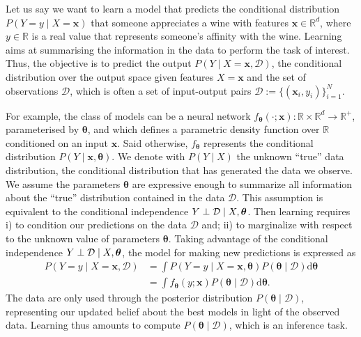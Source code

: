 Let us say we want to learn a model that predicts the conditional distribution $P(Y=y\mid X=\bm{x})$ that someone appreciates a wine with features $\bm{x} \in \mathbb{R}^d$, where $y \in \mathbb{R}$ is a real value that represents someone's affinity with the wine. Learning aims at summarising the information in the data to perform the task of interest. Thus, the objective is to predict the output $P(Y \mid X=\mathbf{x}, \mathcal{D})$, the conditional distribution over the output space given features $X=\bm{x}$ and the set of observations $\mathcal{D}$, which is often a set of input-output pairs  $\mathcal{D}:= \{(\mathbf{x}_i, y_i)\}_{i=1}^N$.

For example, the class of models can be a neural network $f_{\bm \theta}(\cdot; \bm{ x}): \mathbb{R} \times \mathbb{R}^{d} \rightarrow \mathbb{R}^+$, parameterised by $\bm{\theta}$, and which defines a parametric density function over $\mathbb{R}$ conditioned on an input $\bm{x}$. Said otherwise, $f_{\bm{\theta}}$ represents the conditional distribution $P(Y \mid \bm{x}, \bm{\theta})$. We denote with $P(Y\mid X)$ the unknown ``true'' data distribution, the conditional distribution that has generated the data we observe.
We assume the parameters $\bm{\theta}$ are expressive enough to summarize all information about the ``true'' distribution contained in the data $\mathcal{D}$. This assumption is equivalent to the conditional independence $ Y \perp \mathcal{D} \mid X, \bm \theta$. Then learning requires i) to condition our predictions on the data $\mathcal{D}$ and; ii) to marginalize with respect to the unknown value of parameters $\bm \theta$. Taking advantage of the conditional independence $ Y \perp \mathcal{D} \mid X, \bm \theta$, the model for making new predictions is expressed as
\begin{align}
  P(Y=y\mid X=\bm x, \mathcal{D}) &= \int P(Y=y\mid X=\bm x, \bm \theta) P(\bm \theta \mid \mathcal{D}) \text{d}\bm{\theta}\\
  &=\int f_{\bm \theta}(y; \bm x) P(\bm \theta \mid  \mathcal{D}) \text{d}\bm{\theta}.
\end{align}
The data are only used through the posterior distribution $P(\bm \theta  \mid  \mathcal{D})$, representing our updated belief about the best models in light of the observed data. Learning thus amounts to compute $P(\bm \theta \mid \mathcal{D})$, which is an inference task.


